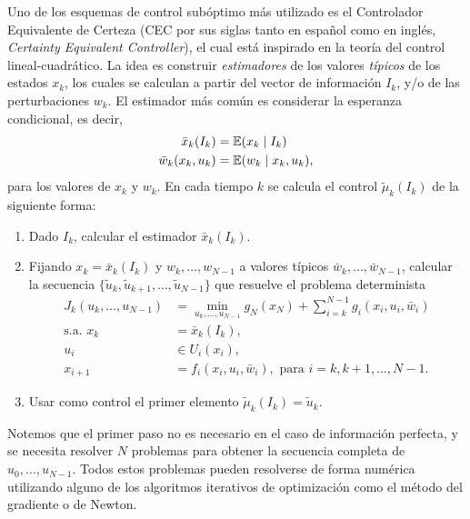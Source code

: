 Uno de los esquemas de control subóptimo más utilizado es el Controlador Equivalente de Certeza (CEC por sus siglas tanto en español como en inglés, \emph{Certainty Equivalent Controller}), el cual está inspirado en la teoría del control lineal-cuadrático. La idea es construir \emph{estimadores} de los valores \emph{típicos} de los estados \(x_{k}\), los cuales se calculan a partir del vector de información \(I_{k}\), y/o de las perturbaciones \(w_{k}\). El estimador más común es considerar la esperanza condicional, es decir,
\begin{align*}
	\bar{x}_{k}(I_{k})			&= \mathbb{E}(x_k \mid I_k) \\
	\bar{w}_{k}(x_{k},u_{k})	&= \mathbb{E}(w_k \mid x_k, u_k),
\end{align*}
para los valores de \(x_{k}\) y \(w_{k}\). En cada tiempo \(k\) se calcula el control \(\tilde{\mu}_{k}(I_{k})\) de la siguiente forma:
\begin{enumerate}
	\item Dado \(I_{k}\), calcular el estimador \(\bar{x}_{k}(I_{k})\).
	\item Fijando \(x_{k} = \bar{x}_{k}(I_{k})\) y \(w_{k}, \dotsc, w_{N-1}\) a valores típicos \(\bar{w}_{k}, \dotsc, \bar{w}_{N-1}\), calcular la secuencia \(\{\tilde{u}_{k}, \tilde{u}_{k+1}, \dotsc, \tilde{u}_{N-1}\}\) que resuelve el problema determinista
	\begin{align*}
		J_{k}(u_{k}, \dotsc, u_{N-1})	&= \min_{u_{k}, \dotsc, u_{N-1}} g_{N}(x_{N}) + \sum_{i=k}^{N-1} g_{i}(x_{i}, u_{i}, \bar{w}_{i}) \\
		\text{s.a. } x_{k}				&= \bar{x}_{k}(I_{k}),\\
		u_{i}							&\in U_{i}(x_{i}), \\
		x_{i+1}							&= f_{i}(x_{i}, u_{i}, \bar{w}_{i}), \text{ para } i = k, k+1, \dotsc, N-1.
	\end{align*}
	\item Usar como control el primer elemento \(\tilde{\mu}_{k}(I_{k}) = \tilde{u}_{k}\).
\end{enumerate}

Notemos que el primer paso no es necesario en el caso de información perfecta, y se necesita resolver \(N\) problemas para obtener la secuencia completa de \(u_{0}, \dotsc, u_{N-1}\). Todos estos problemas pueden resolverse de forma numérica utilizando alguno de los algoritmos iterativos de optimización como el método del gradiente o de Newton.

